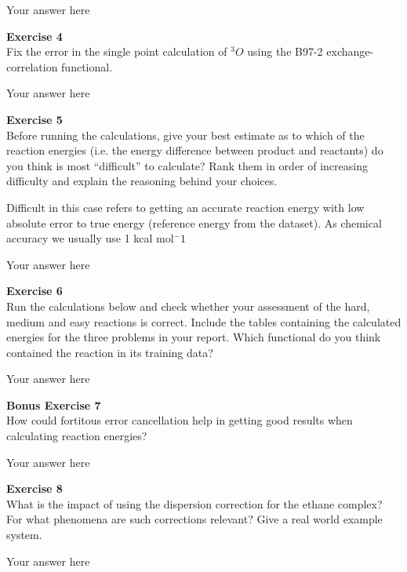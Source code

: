 \documentclass{article}
\begin{document}
Your answer here

\begin{mdframed}
\textbf{Exercise 4}\\
Fix the error in the single point calculation of  $^3 O$ using the B97-2 exchange-correlation functional.
\end{mdframed}

Your answer here

\begin{mdframed}
\textbf{Exercise 5}\\
Before running the calculations, give your best estimate as to which of the reaction energies (i.e. the energy difference between product and reactants) do you think is most ``difficult'' to calculate? Rank them in order of increasing difficulty and explain the reasoning behind your choices.

Difficult in this case refers to getting an accurate reaction energy with low absolute error to true energy (reference energy from the dataset). As chemical accuracy we usually use 1 kcal mol$^ -1$
\end{mdframed}

Your answer here

\begin{mdframed}
\textbf{Exercise 6}\\
Run the calculations below and check whether your assessment of the hard, medium and easy reactions is correct. Include the tables containing the calculated energies for the three problems in your report. Which functional do you think contained the reaction in its training data?
\end{mdframed}

Your answer here

\begin{mdframed}
\textbf{Bonus Exercise 7}\\
How could fortitous error cancellation help in getting good results when calculating reaction energies?
\end{mdframed}

Your answer here

\begin{mdframed}
\textbf{Exercise 8}\\
What is the impact of using the dispersion correction for the ethane complex? For what phenomena are such corrections relevant? Give a real world example system.
\end{mdframed}

Your answer here
\end{document}
